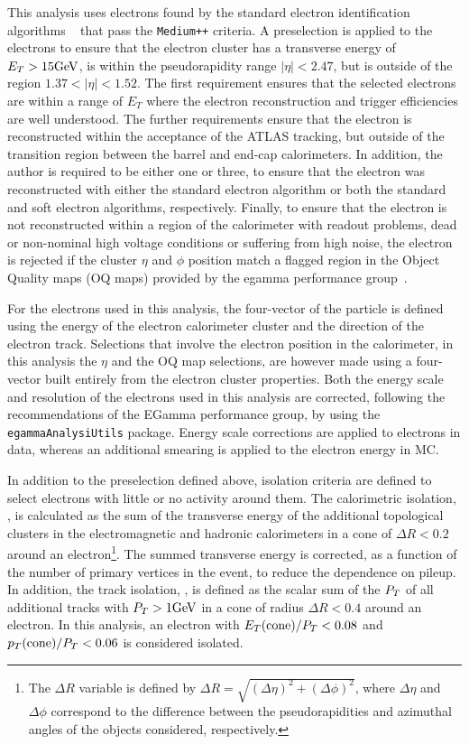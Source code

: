This analysis uses electrons found by the standard electron
identification algorithms ~\cite{AtlasCSCBook} that pass the {\tt Medium++}
criteria. A preselection is applied to the electrons to ensure that
the electron cluster has a transverse energy of $E_T > 15\text{GeV}$, is
within the pseudorapidity range $|\eta|<2.47$, but is outside of the region
$1.37<|\eta|<1.52$. The first requirement ensures that the selected
electrons are within a range of $E_T$ where the electron reconstruction
and trigger efficiencies are well understood. The further requirements
ensure that the electron is reconstructed within the acceptance of
the ATLAS tracking, but outside of the transition region between the
barrel and end-cap calorimeters. 
In addition, the author is required to be either one or three, to ensure that the electron was 
reconstructed with either the standard electron algorithm or both the
standard and soft electron algorithms, respectively.
Finally, to ensure that the electron is not reconstructed within a region of the
calorimeter with readout problems, dead or non-nominal high voltage
conditions or suffering from high noise, the electron is rejected if
the cluster $\eta$ and $\phi$ position match a flagged region in the
Object Quality maps (OQ maps) provided by the egamma
performance group~\cite{EGammaRecomendations}.

For the electrons used in this analysis, the four-vector of the
particle is defined using the energy of the electron calorimeter
cluster and the direction of the electron track. Selections that
involve the electron position in the calorimeter, in this analysis the
$\eta$ and the OQ map selections, are however made using a four-vector built
entirely from the electron cluster properties. Both the energy scale
and resolution of the electrons used in this analysis are corrected,
following the recommendations of the EGamma performance group, by
using the {\tt egammaAnalysiUtils}
package\cite{EGammaRecomendations}. Energy scale corrections are
applied to electrons in data, whereas an additional smearing is
applied to the electron energy in MC.

In addition to the preselection defined above, isolation criteria are
defined to select electrons with little or no activity around
them. The calorimetric isolation, \etcone, is calculated as the sum of
the transverse energy of the additional topological clusters in the
electromagnetic and hadronic calorimeters in a cone of $\Delta R <
0.2$ around an electron\footnote{The $\Delta R$ variable is defined by
$\Delta R=\sqrt{(\Delta\eta)^2+(\Delta\phi)^2}$, where $\Delta \eta$
and $\Delta \phi$ correspond to the difference between
the pseudorapidities and azimuthal angles of the objects considered, respectively.}. 
The summed transverse energy is corrected, as a function of the
number of primary vertices in the event, to reduce the dependence on
pileup. In addition, the track isolation, \ptcone, is defined as the
scalar sum of the $P_{T}$ of all additional tracks with $P_{T}>1\text{GeV}$ in a
cone of radius $\Delta R<0.4$ around an electron. In this analysis, an
electron with $E_{T}(\mathrm{cone})/P_{T}<0.08$ and $p_{T}(\mathrm{cone})/P_{T}<0.06$ is considered isolated.


